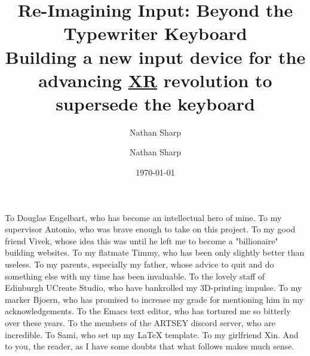 \documentclass[logo,bsc,singlespacing,parskip]{infthesis}
\author{Nathan Sharp}
\date{\today}
\title{Re-Imagining Input: Beyond the Typewriter Keyboard\\\medskip
\large Building a new input device for the advancing \hyperref[org39cbd51]{XR} revolution to supersede the keyboard}
\begin{document}
\begin{preliminary}
\author{Nathan Sharp}

\newenvironment{ethics}
  {\begin{frontenv}{Research Ethics Approval}{\LARGE}}
  {\end{frontenv}\newpage}


\maketitle

\begin{acknowledgements}
To Douglas Engelbart, who has become an intellectual hero of mine.
To my supervisor Antonio, who was brave enough to take on this project.
To my good friend Vivek, whose idea this was until he left me to become a "billionaire" building websites.
To my flatmate Timmy, who has been only slightly better than useless.
To my parents, especially my father, whose advice to quit and do something else with my time has been invaluable.
To the lovely staff of Edinburgh UCreate Studio, who have bankrolled my 3D-printing impulse.
To my marker Bjoern, who has promised to increase my grade for mentioning him in my acknowledgements.
To the Emacs text editor, who has tortured me so bitterly over these years.
To the members of the ARTSEY discord server, who are incredible.
To Sami, who set up my LaTeX template.
To my girlfriend Xin.
And to you, the reader, as I have some doubts that what follows makes much sense.
\end{acknowledgements}


\end{preliminary}
\end{document}
